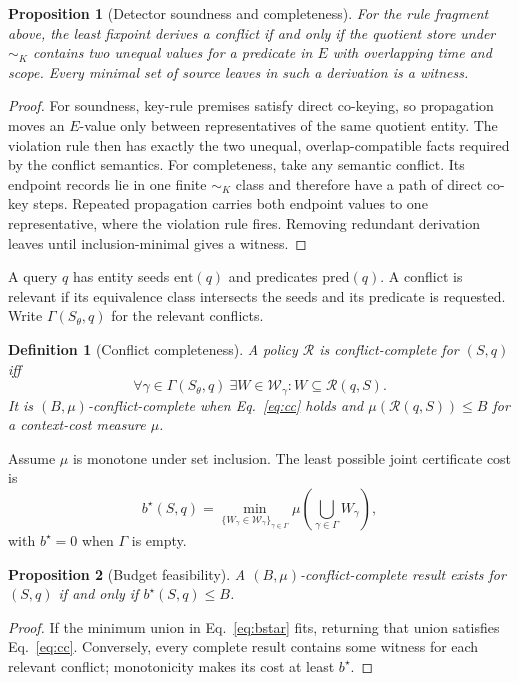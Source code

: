 \documentclass[letterpaper]{article} %
\newtheorem{definition}{Definition}
\newtheorem{proposition}{Proposition}
\newcommand{\R}{\mathcal{R}}
\newcommand{\W}{\mathcal{W}}
\begin{document}
\begin{proposition}[Detector soundness and completeness]
For the rule fragment above, the least fixpoint derives a conflict if and only
if the quotient store under $\sim_K$ contains two unequal values for a
predicate in $E$ with overlapping time and scope.  Every minimal set of source
leaves in such a derivation is a witness.
\end{proposition}
\begin{proof}
For soundness, key-rule premises satisfy direct co-keying, so propagation moves
an $E$-value only between representatives of the same quotient entity.  The
violation rule then has exactly the two unequal, overlap-compatible facts
required by the conflict semantics.  For completeness, take any semantic
conflict.  Its endpoint records lie in one finite $\sim_K$ class and therefore
have a path of direct co-key steps.  Repeated propagation carries both endpoint
values to one representative, where the violation rule fires.  Removing
redundant derivation leaves until inclusion-minimal gives a witness.
\end{proof}

A query $q$ has entity seeds $\mathrm{ent}(q)$ and predicates
$\mathrm{pred}(q)$.  A conflict is relevant if its equivalence class
intersects the seeds and its predicate is requested.  Write
$\Gamma(S_\theta,q)$ for the relevant conflicts.

\begin{definition}[Conflict completeness]
A policy $\R$ is conflict-complete for $(S,q)$ iff
\begin{equation}
\forall\gamma\in\Gamma(S_\theta,q)\ \exists W\in\W_\gamma:
W\subseteq\R(q,S). \label{eq:cc}
\end{equation}
It is $(B,\mu)$-conflict-complete when Eq.~\ref{eq:cc} holds and
$\mu(\R(q,S))\le B$ for a context-cost measure $\mu$.
\end{definition}

Assume $\mu$ is monotone under set inclusion.  The least possible joint
certificate cost is
\begin{equation}
b^\star(S,q)=
\min_{\{W_\gamma\in\W_\gamma\}_{\gamma\in\Gamma}}
\mu\!\left(\bigcup_{\gamma\in\Gamma}W_\gamma\right),
\label{eq:bstar}
\end{equation}
with $b^\star=0$ when $\Gamma$ is empty.

\begin{proposition}[Budget feasibility]
\label{prop:budget}
A $(B,\mu)$-conflict-complete result exists for $(S,q)$ if and only if
$b^\star(S,q)\le B$.
\end{proposition}
\begin{proof}
If the minimum union in Eq.~\ref{eq:bstar} fits, returning that union satisfies
Eq.~\ref{eq:cc}.  Conversely, every complete result contains some witness for
each relevant conflict; monotonicity makes its cost at least $b^\star$.
\end{proof}
\end{document}
